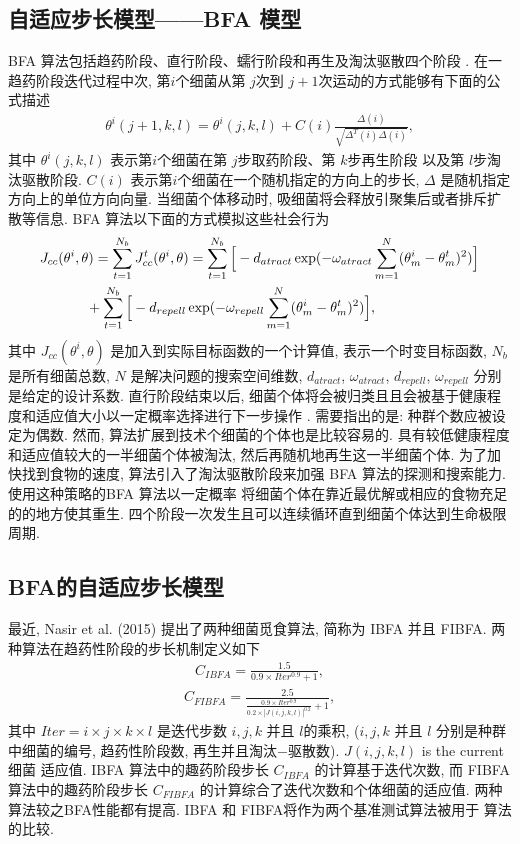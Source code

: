 \subsection{自适应步长模型——BFA 模型}\label{TPMsec1}
    BFA 算法包括趋药阶段、直行阶段、蠕行阶段和再生及淘汰驱散四个阶段 .
    在一趋药阶段迭代过程中次, 第$i$个细菌从第 $j$次到  $j+1$次运动的方式能够有下面的公式描述
\begin{align}\label{AdapchemCI}
    \theta^{i}(j+1,k,l)=\theta^{i}(j,k,l)+C(i)\frac{\Delta(i)}{\sqrt{\Delta^{T}(i)\Delta(i)}},
\end{align}
其中 $\theta^{i}(j,k,l)$ 表示第$i$个细菌在第 $j$步取药阶段、第 $k$步再生阶段 以及第 $l$步淘汰驱散阶段.
$C(i)$ 表示第$i$个细菌在一个随机指定的方向上的步长, $\Delta$ 是随机指定方向上的单位方向向量. 当细菌个体移动时, 吸细菌将会释放引聚集后或者排斥扩散等信息. BFA 算法以下面的方式模拟这些社会行为
\begin{align}
    J_{cc}&(\theta^{i}, \theta)=\sum_{t=1}^{N_b}J_{cc}^{t}(\theta^{i},\theta)
= \sum_{t=1}^{N_b}\Big[-d_{atract}\exp(-\omega_{atract}\sum_{m=1}^{N}(\theta_{m}^{i}-\theta_{m}^{t})^2)\Big]\notag \\
&\qquad+\sum_{t=1}^{N_b}\Big[-d_{repell}\exp(-\omega_{repell}\sum_{m=1}^{N}(\theta_{m}^{i}-\theta_{m}^{t})^2)\Big],
\end{align}
其中 $J_{cc}(\theta^i,\theta)$ 是加入到实际目标函数的一个计算值, 表示一个时变目标函数, $N_b$ 是所有细菌总数, $N$ 是解决问题的搜索空间维数, $d_{atract}$, $\omega_{atract}$, $d_{repell}$, $\omega_{repell}$ 分别是给定的设计系数.
直行阶段结束以后, 细菌个体将会被归类且且会被基于健康程度和适应值大小以一定概率选择进行下一步操作 .
需要指出的是: 种群个数应被设定为偶数. 然而, 算法扩展到技术个细菌的个体也是比较容易的.
具有较低健康程度和适应值较大的一半细菌个体被淘汰, 然后再随机地再生这一半细菌个体.
为了加快找到食物的速度, 算法引入了淘汰驱散阶段来加强 BFA 算法的探测和搜索能力. 使用这种策略的BFA 算法以一定概率 将细菌个体在靠近最优解或相应的食物充足的的地方使其重生.
四个阶段一次发生且可以连续循环直到细菌个体达到生命极限周期.
\subsection{BFA的自适应步长模型}
最近, Nasir et al. (2015) 提出了两种细菌觅食算法, 简称为 IBFA 并且 FIBFA. 两种算法在趋药性阶段的步长机制定义如下
\begin{align}\label{AdapchemCIBFA}
    C_{IBFA}=\frac {1.5} {0.9\times Iter^{0.9}+1},
\end{align}
\begin{align}\label{AdapchemCF}
     C_{FIBFA}= \frac {2.5} {\frac{0.9\times Iter^{0.9}}{0.2\times|J(i,j,k,l)|^{0.2}}+1},
\end{align}
其中 $Iter=i\times j\times k\times l$ 是迭代步数 $i, j, k$ 并且 $l$的乘积, ($i, j, k$ 并且 $l$ 分别是种群中细菌的编号, 趋药性阶段数, 再生并且淘汰$-$驱散数). $J(i, j, k, l)$ is the current 细菌 适应值.
IBFA 算法中的趣药阶段步长 $C_{IBFA}$ 的计算基于迭代次数, 而 FIBFA算法中的趣药阶段步长 $C_{FIBFA}$ 的计算综合了迭代次数和个体细菌的适应值.
两种算法较之BFA性能都有提高. IBFA 和 FIBFA将作为两个基准测试算法被用于 算法的比较.
